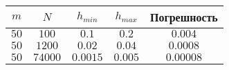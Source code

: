\documentclass[a4paper, 14pt]{extarticle}
\begin{document}
	\begin{center}
	\begin{tabular}{|c|c|c|c|c|}
		\hline
			$m$ & $N$ & $h_{min}$ & $h_{max}$ & Погрешность\\
		\hline
		 	$50$ & $100$ & $0.1$ & $0.2$ & $0.004$\\
 		\hline
 			$50$ & $1200$ & $0.02$ & $0.04$ & $0.0008$\\
 		\hline
 			$50$ & $74000$ & $0.0015$ & $0.005$ & $0.00008$\\
 		\hline
 			
	\end{tabular}
	\end{center}
\end{document}
